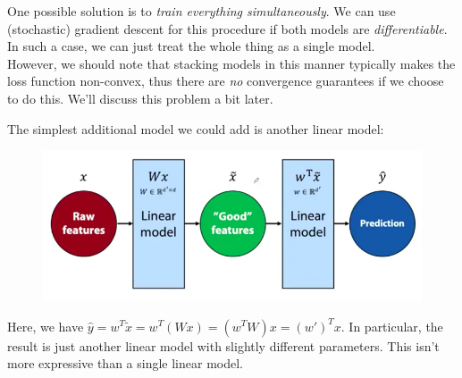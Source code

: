 One possible solution is to \textit{train everything simultaneously}. We can use (stochastic) gradient descent for this procedure if both models are \textit{differentiable}. In such a case, we can just treat the whole thing as a single model.\\

However, we should note that stacking models in this manner typically makes the loss function non-convex, thus there are \textit{no} convergence guarantees if we choose to do this. We'll discuss this problem a bit later.


\minirule


The simplest additional model we could add is another linear model:
\begin{figure}[H]
\centering
\includegraphics[scale=0.3]{stackinglinearmodels.png}
\end{figure}
Here, we have $\hat{y} = w^T \tilde{x} = w^T (Wx) = (w^T W)x = (w')^Tx$. In particular, the result is just another linear model with slightly different parameters. This isn't more expressive than a single linear model.



